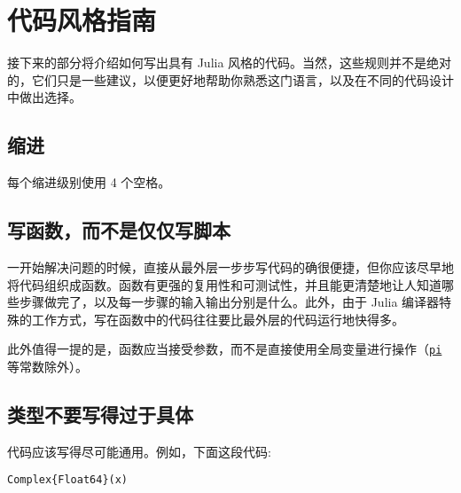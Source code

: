 \hypertarget{8293020885235442145}{}


\chapter{代码风格指南}



接下来的部分将介绍如何写出具有 Julia 风格的代码。当然，这些规则并不是绝对的，它们只是一些建议，以便更好地帮助你熟悉这门语言，以及在不同的代码设计中做出选择。



\hypertarget{5688357021956898116}{}


\section{缩进}



每个缩进级别使用 4 个空格。



\hypertarget{14598192216141137141}{}


\section{写函数，而不是仅仅写脚本}



一开始解决问题的时候，直接从最外层一步步写代码的确很便捷，但你应该尽早地将代码组织成函数。函数有更强的复用性和可测试性，并且能更清楚地让人知道哪些步骤做完了，以及每一步骤的输入输出分别是什么。此外，由于 Julia 编译器特殊的工作方式，写在函数中的代码往往要比最外层的代码运行地快得多。



此外值得一提的是，函数应当接受参数，而不是直接使用全局变量进行操作（\hyperlink{4355513108985533054}{\texttt{pi}} 等常数除外）。



\hypertarget{14766885101141675893}{}


\section{类型不要写得过于具体}



代码应该写得尽可能通用。例如，下面这段代码:




\begin{verbatim}
Complex{Float64}(x)
\end{verbatim}



